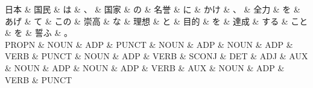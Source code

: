 \documentclass[tikz,border=5pt]{standalone}
\begin{document}
\normalsize
\begin{dependency}[edge unit distance=10.4pt]
    \begin{deptext}[column sep=1em]
        日本 \& 国民 \& は \& 、 \& 国家 \& の \& 名誉 \& に \& かけ \& 、 \& 全力 \& を \& あげ \& て \& この \& 崇高 \& な \& 理想 \& と \& 目的 \& を \& 達成 \& する \& こと \& を \& 誓ふ \& 。\\
        PROPN \& NOUN \& ADP \& PUNCT \& NOUN \& ADP \& NOUN \& ADP \& VERB \& PUNCT \& NOUN \& ADP \& VERB \& SCONJ \& DET \& ADJ \& AUX \& NOUN \& ADP \& NOUN \& ADP \& VERB \& AUX \& NOUN \& ADP \& VERB \& PUNCT\\
    \end{deptext}
\end{dependency}
\end{document}
